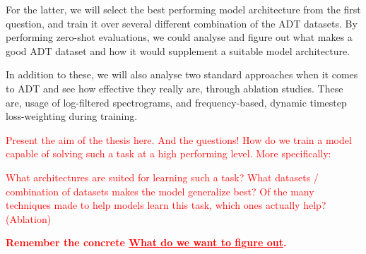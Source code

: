 For the latter, we will select the best performing model architecture from the first question, and train it over several different combination of the \gls{ADT} datasets. By performing zero-shot evaluations, we could analyse and figure out what makes a good \gls{ADT} dataset and how it would supplement a suitable model architecture.

In addition to these, we will also analyse two standard approaches when it comes to \gls{ADT} and see how effective they really are, through ablation studies. These are, usage of log-filtered spectrograms, and frequency-based, dynamic timestep loss-weighting during training. 

\textcolor{red}{
    Present the aim of the thesis here. And the \b{questions!}
How do we train a model capable of solving such a task at a high performing level. More specifically:
}


\textcolor{red}{
What architectures are suited for learning such a task?
What datasets / combination of datasets makes the model generalize best?
Of the many techniques made to help models learn this task, which ones actually help? (Ablation)
}

\textcolor{red}{\textbf{Remember the concrete \underline{What do we want to figure out}.}}